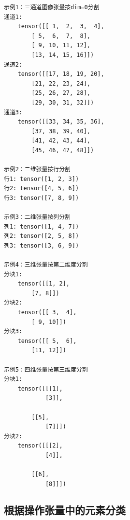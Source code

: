 \begin{lstlisting}[style=demostyle,numbers=none]
示例1：三通道图像张量按dim=0分割
通道1:
    tensor([[ 1,  2,  3,  4],
        [ 5,  6,  7,  8],
        [ 9, 10, 11, 12],
        [13, 14, 15, 16]])
通道2:
    tensor([[17, 18, 19, 20],
        [21, 22, 23, 24],
        [25, 26, 27, 28],
        [29, 30, 31, 32]])
通道3:
    tensor([[33, 34, 35, 36],
        [37, 38, 39, 40],
        [41, 42, 43, 44],
        [45, 46, 47, 48]])

示例2：二维张量按行分割
行1: tensor([1, 2, 3])
行2: tensor([4, 5, 6])
行3: tensor([7, 8, 9])

示例3：二维张量按列分割
列1: tensor([1, 4, 7])
列2: tensor([2, 5, 8])
列3: tensor([3, 6, 9])

示例4：三维张量按第二维度分割
分块1:
    tensor([[1, 2],
        [7, 8]])
分块2:
    tensor([[ 3,  4],
        [ 9, 10]])
分块3:
    tensor([[ 5,  6],
        [11, 12]])

示例5：四维张量按第三维度分割
分块1:
    tensor([[[1],
            [3]],

        [[5],
            [7]]])
分块2:
    tensor([[[2],
            [4]],

        [[6],
            [8]]])
\end{lstlisting}

\subsection{根据操作张量中的元素分类}
\label{subsec:Pytorch的根据操作张量中的元素分类}
